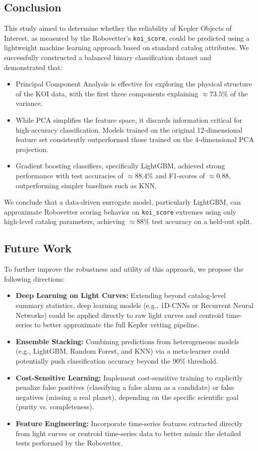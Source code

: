 \subsection{Conclusion}
This study aimed to determine whether the reliability of Kepler Objects of Interest, as measured by the Robovetter's \texttt{koi\_score}, could be predicted using a lightweight machine learning approach based on standard catalog attributes. We successfully constructed a balanced binary classification dataset and demonstrated that:
\begin{itemize}
    \item Principal Component Analysis is effective for exploring the physical structure of the KOI data, with the first three components explaining $\approx 73.5\%$ of the variance.
    \item While PCA simplifies the feature space, it discards information critical for high-accuracy classification. Models trained on the original 12-dimensional feature set consistently outperformed those trained on the 4-dimensional PCA projection.
    \item Gradient boosting classifiers, specifically LightGBM, achieved strong performance with test accuracies of $\approx 88.4\%$ and F1-scores of $\approx 0.88$, outperforming simpler baselines such as KNN.
\end{itemize}
We conclude that a data-driven surrogate model, particularly LightGBM, can approximate Robovetter scoring behavior on \texttt{koi\_score} extremes using only high-level catalog parameters, achieving $\approx 88\%$ test accuracy on a held-out split.

\subsection{Future Work}
To further improve the robustness and utility of this approach, we propose the following directions:
\begin{itemize}
    \item \textbf{Deep Learning on Light Curves:} Extending beyond catalog-level summary statistics, deep learning models (e.g., 1D-CNNs or Recurrent Neural Networks) could be applied directly to raw light curves and centroid time-series to better approximate the full Kepler vetting pipeline.
    \item \textbf{Ensemble Stacking:} Combining predictions from heterogeneous models (e.g., LightGBM, Random Forest, and KNN) via a meta-learner could potentially push classification accuracy beyond the 90\% threshold.
    \item \textbf{Cost-Sensitive Learning:} Implement cost-sensitive training to explicitly penalize false positives (classifying a false alarm as a candidate) or false negatives (missing a real planet), depending on the specific scientific goal (purity vs. completeness).
    \item \textbf{Feature Engineering:} Incorporate time-series features extracted directly from light curves or centroid time-series data to better mimic the detailed tests performed by the Robovetter.
\end{itemize}
